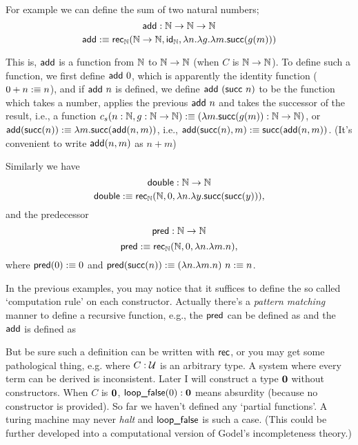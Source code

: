 \newcommand{\add}{\name{add}}
For example we can define the sum of two natural numbers;
$$
    \add: \nat\to\nat\to\nat
$$
$$
    \add \defn \rec_\nat(\nat\to\nat,\id_\nat,\lambda n.\lambda g.\lambda m.\succn(g(m)))
$$

This is, $\add$ is a function from $\mathbb{N}$ to $\mathbb{N}\to\mathbb{N}$ (when 
$C$ is $\mathbb{N}\to\mathbb{N}$). To define such a function, we first define 
$\add\ 0$, which is apparently the identity function 
($0+n :\equiv n$), and if $\add\ n$ is defined, we define 
$\add\ (\succn\ n)$ to be the function which takes a number, applies
the previous $\add\ n$ and takes the successor of the result, i.e.,
a function $c_s(n:\mathbb{N}, g:\mathbb{N}\to\mathbb{N}) :\equiv (\lambda m.\text{\sf succ}(g(m)): 
\mathbb{N}\to\mathbb{N})$, or $\add(\succn(n))\defn \lambda m. \succn(\add(n, m))$, 
i.e., $\add(\succn(n), m)\defn\succn(\add(n, m))$. (It's convenient
to write $\add(n, m)$ as $n+m$)

Similarly we have 
$$
    \text{\sf double}: \mathbb{N}\to\mathbb{N}
$$
$$
    \text{\sf double} :\equiv \text{\sf rec}_{\mathbb{N}}(\mathbb{N}, 0, \lambda n.\lambda y.\text{\sf succ}(\text{\sf succ}(y))),
$$
and the predecessor
\newcommand{\pred}{\name{pred}}
$$
    \pred: \nat\to\nat
$$
$$
    \pred \defn \rec_\nat(\nat, 0, \lambda n.\lambda m. n),
$$
where $\pred(0)\defn0$ and $\pred(\succn(n))\defn (\lambda n.\lambda m. n)\ n\defn n$.

In the previous examples, you may notice that it suffices to define the
so called `computation rule' on each constructor. Actually there's a
{\it pattern matching} manner to define a recursive function, e.g., the
$\pred$ can be defined as
\eq {
    \pred(0) &\defn 0 \\
    \pred(\succn(n)) &\defn n
}
and the $\text{\sf add}$ is defined as

But be sure such a definition can be written with $\text{\sf rec}$, or you may
get some pathological thing, e.g.
where $C:\mathcal{U}$ is an arbitrary type. A system where every term
can be derived is inconsistent. Later I will construct a type $\mathbf{0}$ 
without constructors. When $C$ is $\mathbf{0}$, $\text{\sf loop\_false}(0):\mathbf{0}$ 
means absurdity (because no constructor is provided). So far we haven't
defined any `partial functions'. A turing machine may never {\it halt}
and $\text{\sf loop\_false}$ is such a case. (This could be further developed
into a computational version of Godel's incompleteness theory.)

